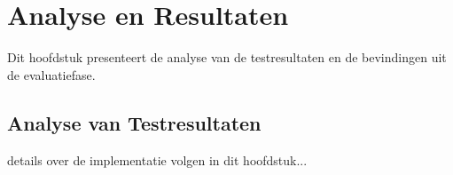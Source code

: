 \chapter{Analyse en Resultaten}
\label{ch:analyse}

Dit hoofdstuk presenteert de analyse van de testresultaten en de bevindingen uit de evaluatiefase.

\section{Analyse van Testresultaten}
\label{sec:analyse-resultaten}

details over de implementatie volgen in dit hoofdstuk...